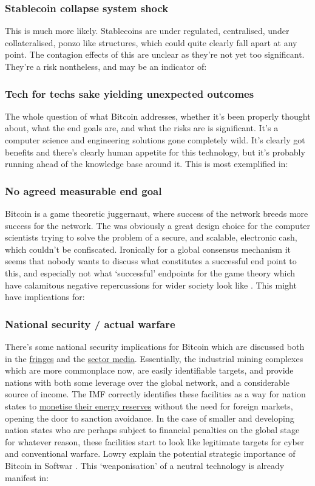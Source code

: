 \subsubsection{Stablecoin collapse system shock}
This is much more likely. Stablecoins are under regulated, centralised, under collateralised, ponzo like structures, which could quite clearly fall apart at any point. The contagion effects of this are unclear as they're not yet too significant. They're a risk nontheless, and may be an indicator of:
\subsubsection{Tech for techs sake yielding unexpected outcomes}
The whole question of what Bitcoin addresses, whether it's been properly thought about, what the end goals are, and what the risks are is significant. It's a computer science and engineering solutions gone completely wild. It's clearly got benefits and there's clearly human appetite for this technology, but it's probably running ahead of the knowledge base around it. This is most exemplified in:
\subsubsection{No agreed measurable end goal}
 Bitcoin is a game theoretic juggernaut, where success of the network breeds more success for the network. The was obviously a great design choice for the computer scientists trying to solve the problem of a secure, and scalable, electronic cash, which couldn't be confiscated. Ironically for a global consensus mechanism it seems that nobody wants to discuss what constitutes a successful end point to this, and especially not what `successful' endpoints for the game theory which have calamitous negative repercussions for wider society look like \cite{warren2023bitcoin}.  This might have implications for:
\subsubsection{National security / actual warfare}
There's some national security implications for Bitcoin which are discussed both in the \href{https://twitter.com/JasonPLowery/status/1512775981693648897?}{fringes} and the \href{https://www.coindesk.com/layer2/2022/04/04/why-bitcoin-mining-is-a-matter-of-national-security/}{sector media}. Essentially, the industrial mining complexes which are more commonplace now, are easily identifiable targets, and provide nations with both some leverage over the global network, and a considerable source of income. The IMF correctly identifies these facilities as a way for nation states to \href{https://www.imf.org/en/Publications/GFSR/Issues/2022/04/19/global-financial-stability-report-april-2022}{monetise their energy reserves} without the need for foreign markets, opening the door to sanction avoidance. In the case of smaller and developing nation states who are perhaps subject to financial penalties on the global stage for whatever reason, these facilities start to look like legitimate targets for cyber and conventional warfare. Lowry explain the potential strategic importance of Bitcoin in Softwar \cite{Lowery2023}. This `weaponisation' of a neutral technology is already manifest in:
